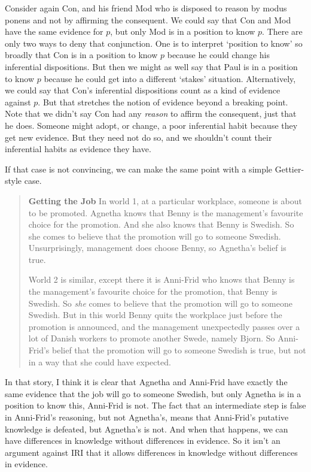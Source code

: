 \documentclass[11pt,oneside]{book}
\begin{document}
Consider again Con, and his friend Mod who is disposed to reason by modus ponens and not by affirming the consequent. We could say that Con and Mod have the same evidence for $p$, but only Mod is in a position to know $p$. There are only two ways to deny that conjunction. One is to interpret `position to know' so broadly that Con is in a position to know $p$ because he could change his inferential dispositions. But then we might as well say that Paul is in a position to know $p$ because he could get into a different `stakes' situation. Alternatively, we could say that Con's inferential dispositions count as a kind of evidence against $p$. But that stretches the notion of evidence beyond a breaking point. Note that we didn't say Con had any \textit{reason} to affirm the consequent, just that he does. Someone might adopt, or change, a poor inferential habit because they get new evidence. But they need not do so, and we shouldn't count their inferential habits as evidence they have.

If that case is not convincing, we can make the same point with a simple Gettier-style case.

\begin{quote}
\textbf{Getting the Job}
In world 1, at a particular workplace, someone is about to be promoted. Agnetha knows that Benny is the management's favourite choice for the promotion. And she also knows that Benny is Swedish. So she comes to believe that the promotion will go to someone Swedish. Unsurprisingly, management does choose Benny, so Agnetha's belief is true.

World 2 is similar, except there it is Anni-Frid who knows that Benny is the management's favourite choice for the promotion, that Benny is Swedish. So \textit{she} comes to believe that the promotion will go to someone Swedish. But in this world Benny quits the workplace just before the promotion is announced, and the management unexpectedly passes over a lot of Danish workers to promote another Swede, namely Bj\:orn. So Anni-Frid's belief that the  promotion will go to someone Swedish is true, but not in a way that she could have expected.
\end{quote}

\noindent In that story, I think it is clear that Agnetha and Anni-Frid have exactly the same evidence that the job will go to someone Swedish, but only Agnetha is in a position to know this, Anni-Frid is not. The fact that an intermediate step is false in Anni-Frid's reasoning, but not Agnetha's, means that Anni-Frid's putative knowledge is defeated, but Agnetha's is not. And when that happens, we can have differences in knowledge without differences in evidence. So it isn't an argument against IRI that it allows differences in knowledge without differences in evidence.
\end{document}
